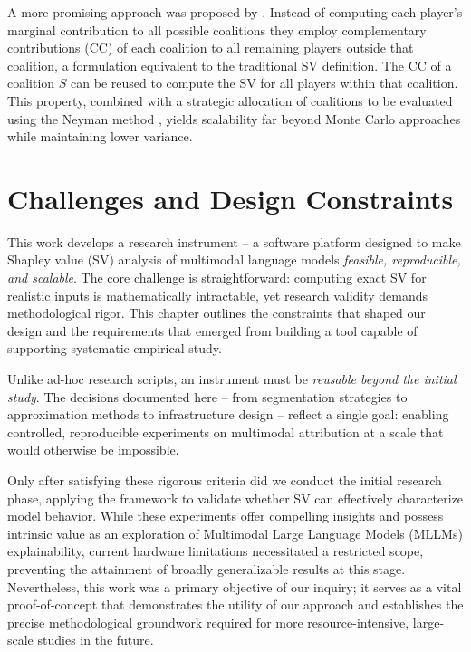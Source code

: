 A more promising approach was proposed by \textcite{shapleyapproximations}. Instead of computing each player's marginal contribution to all possible coalitions they employ complementary contributions (CC) of each coalition to all remaining players outside that coalition, a formulation equivalent to the traditional SV definition. The CC of a coalition $S$ can be reused to compute the SV for all players within that coalition. This property, combined with a strategic allocation of coalitions to be evaluated using the Neyman method \parencite{nayman}, yields scalability far beyond Monte Carlo approaches while maintaining lower variance.

\chapter{Challenges and Design Constraints}
\label{sec:requirements}

This work develops a research instrument -- a software platform designed to make Shapley value (SV) analysis of multimodal language models \emph{feasible, reproducible, and scalable}. The core challenge is straightforward: computing exact SV for realistic inputs is mathematically intractable, yet research validity demands methodological rigor. This chapter outlines the constraints that shaped our design and the requirements that emerged from building a tool capable of supporting systematic empirical study.

Unlike ad-hoc research scripts, an instrument must be \emph{reusable beyond the initial study}. The decisions documented here -- from segmentation strategies to approximation methods to infrastructure design -- reflect a single goal: enabling controlled, reproducible experiments on multimodal attribution at a scale that would otherwise be impossible.

Only after satisfying these rigorous criteria did we conduct the initial research phase, applying the framework to validate whether SV can effectively characterize model behavior. While these experiments offer compelling insights and possess intrinsic value as an exploration of Multimodal Large Language Models (MLLMs) explainability, current hardware limitations necessitated a restricted scope, preventing the attainment of broadly generalizable results at this stage. Nevertheless, this work was a primary objective of our inquiry; it serves as a vital proof-of-concept that demonstrates the utility of our approach and establishes the precise methodological groundwork required for more resource-intensive, large-scale studies in the future.


